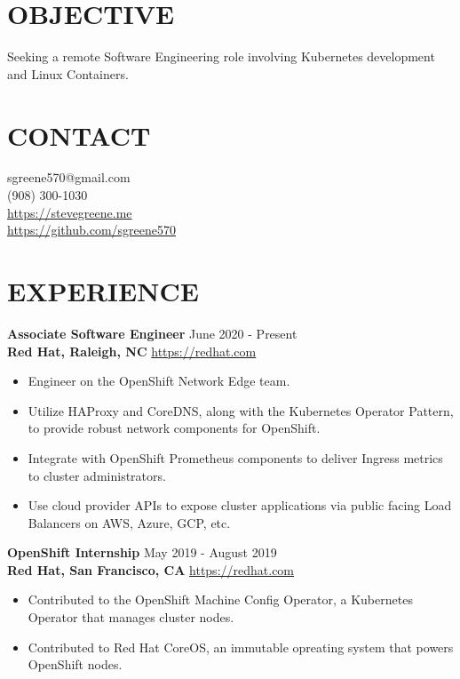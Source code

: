 \documentclass[line, margin, 11pt]{res}
\begin{document}

\begin{resume}

\section{\small OBJECTIVE}
Seeking a remote Software Engineering role involving Kubernetes development and Linux Containers.

\section{\small CONTACT}
sgreene570@gmail.com \\
(908) 300-1030 \\
\url{https://stevegreene.me} \\
\url{https://github.com/sgreene570}

\section{\small EXPERIENCE}
{\bf \large{Associate Software Engineer}} \hfill June 2020 - Present \\
{\bf Red Hat, Raleigh, NC} \hfill \url{https://redhat.com}
\begin{itemize}
    \item Engineer on the OpenShift Network Edge team.
    \item Utilize HAProxy and CoreDNS, along with the Kubernetes Operator Pattern, to provide robust network components for OpenShift.
    \item Integrate with OpenShift Prometheus components to deliver Ingress metrics to cluster administrators.
    \item Use cloud provider APIs to expose cluster applications via public facing Load Balancers on AWS, Azure, GCP, etc.
\end{itemize}


{\bf \large{OpenShift Internship}} \hfill May 2019 - August 2019 \\
{\bf Red Hat, San Francisco, CA} \hfill \url{https://redhat.com}
\begin{itemize}
    \item Contributed to the OpenShift Machine Config Operator, a Kubernetes Operator that manages cluster nodes.
    \item Contributed to Red Hat CoreOS, an immutable opreating system that powers OpenShift nodes.
\end{itemize}



\end{resume}
\end{document}

